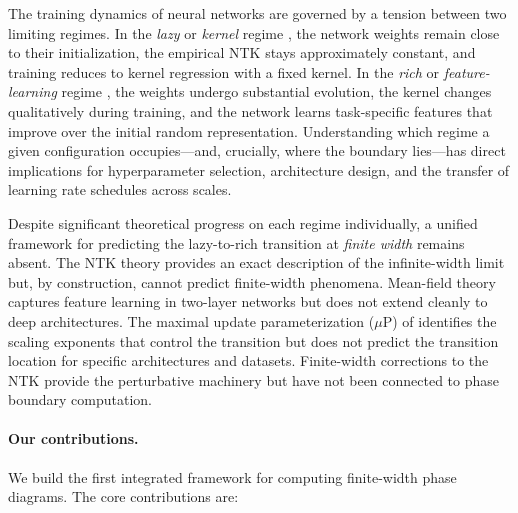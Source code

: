 \documentclass[11pt]{article}
\theoremstyle{definition}
\newcommand{\muP}{\mu\text{P}}
\begin{document}
The training dynamics of neural networks are governed by a tension between two limiting regimes. In the \emph{lazy} or \emph{kernel} regime \citep{jacot2018neural,chizat2019lazy}, the network weights remain close to their initialization, the empirical NTK stays approximately constant, and training reduces to kernel regression with a fixed kernel. In the \emph{rich} or \emph{feature-learning} regime \citep{mei2018mean,yang2021tensor}, the weights undergo substantial evolution, the kernel changes qualitatively during training, and the network learns task-specific features that improve over the initial random representation. Understanding which regime a given configuration occupies---and, crucially, where the boundary lies---has direct implications for hyperparameter selection, architecture design, and the transfer of learning rate schedules across scales.

Despite significant theoretical progress on each regime individually, a unified framework for predicting the lazy-to-rich transition at \emph{finite width} remains absent. The NTK theory \citep{jacot2018neural} provides an exact description of the infinite-width limit but, by construction, cannot predict finite-width phenomena. Mean-field theory \citep{mei2018mean,rotskoff2018parameters} captures feature learning in two-layer networks but does not extend cleanly to deep architectures. The maximal update parameterization ($\muP$) of \citet{yang2021tensor} identifies the scaling exponents that control the transition but does not predict the transition location for specific architectures and datasets. Finite-width corrections to the NTK \citep{dyer2020asymptotics,huang2020dynamics} provide the perturbative machinery but have not been connected to phase boundary computation.

\paragraph{Our contributions.} We build the first integrated framework for computing finite-width phase diagrams. The core contributions are:
\end{document}
